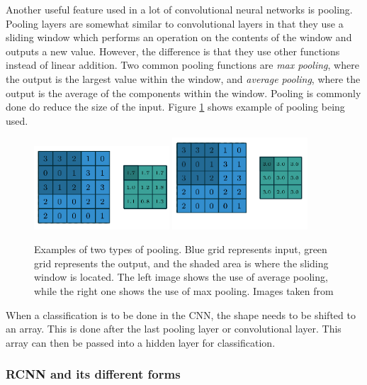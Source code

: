  
 Another useful feature used in a lot of convolutional neural networks is pooling. Pooling layers are somewhat similar to convolutional layers in that they use a sliding window which performs an operation on the contents of the window and outputs a new value. However, the difference is that they use other functions instead of linear addition. Two common pooling functions are \textit{max pooling}, where the output is the largest value within the window, and \textit{average pooling}, where the output is the average of the components within the window.  Pooling is commonly done do reduce the size of the input. Figure \ref{fig:pooling} shows example of pooling being used.
 
 \begin{figure}[hbtp]
\begin{center}
\includegraphics[width = 0.45\textwidth]{./Images/avgPool.png}
\includegraphics[width = 0.45\textwidth]{./Images/maxPool.png}
\caption{Examples of two types of pooling. Blue grid represents input, green grid represents the output, and the shaded area is where the sliding window is located. The left image shows the use of average pooling, while the right one shows the use of max pooling.
Images taken from \cite{convArit}}
\label{fig:pooling}
\end{center}
\end{figure} 
 
When a classification is to be done in the CNN, the shape needs to be shifted to an array. This is done after the last pooling layer or convolutional layer. This array can then be passed into a hidden layer for classification.

\subsubsection{RCNN and its different forms}

